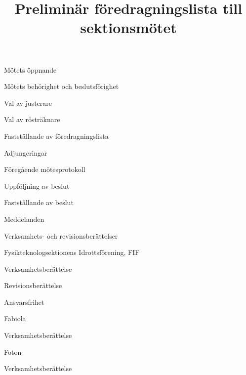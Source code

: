 \documentclass{sektionsmote}
\title{Preliminär föredragningslista till sektionsmötet}
\begin{document}
\maketitle

\begin{ootd}

\item{Mötets öppnande}

\item{Mötets behörighet och beslutsförighet}

\item{Val av justerare}

\item{Val av rösträknare}

\item{Fastställande av föredragningslista}

\item{Adjungeringar}

\item{Föregående mötesprotokoll}

\item{Uppföljning av beslut}

\item{Fastställande av beslut}

\item{Meddelanden}

\item{Verksamhets- och revisionsberättelser}
\begin{ootd}
    \item Fysikteknologsektionens Idrottsförening, FIF
    \begin{ootd}
        \item Verksamhetsberättelse
        \item Revisionsberättelse
        \item Ansvarsfrihet
    \end{ootd}
    \item Fabiola
    \begin{ootd}
        \item Verksamhetsberättelse
    \end{ootd}
    \item Foton
    \begin{ootd}
        \item Verksamhetsberättelse
    \end{ootd}
\end{ootd}


\end{ootd}
\end{document}

